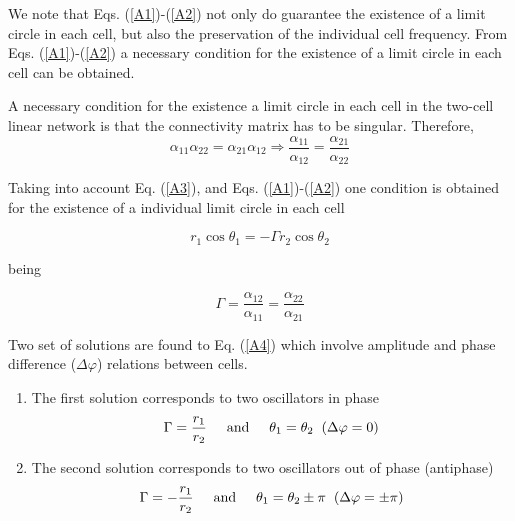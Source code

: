 We note that Eqs. (\ref{A1})-(\ref{A2}) not only do guarantee the existence of a limit circle in each cell, but also the preservation of the individual cell frequency. From Eqs. (\ref{A1})-(\ref{A2}) a necessary condition for the existence of a limit circle in each cell can be obtained.

\begin{Statement}
A necessary condition for the existence a limit circle in each cell in the two-cell linear network is that the connectivity matrix has to be singular. Therefore,
\begin{equation}
    \alpha_{11}\alpha_{22} = \alpha_{21}\alpha_{12} \Longrightarrow \frac{\alpha_{11}}{\alpha_{12}} = \frac{\alpha_{21}}{\alpha_{22}} 
    \label{A3}
\end{equation}
\end{Statement}

Taking into account Eq. (\ref{A3}), and Eqs. (\ref{A1})-(\ref{A2}) one condition is obtained for the existence of a individual limit circle in each cell

\begin{equation}
    r_{1}\cos{\theta_{1}} = - \Gamma r_{2}\cos{\theta_{2}}
    \label{A4}
\end{equation}

being 

\begin{equation}
\Gamma = \frac{\alpha_{12}}{\alpha_{11}} = \frac{\alpha_{22}}{\alpha_{21}}
\end{equation}

Two set of solutions are found to Eq. (\ref{A4}) which involve amplitude and phase difference ($\Delta \varphi$) relations between cells.

\begin{enumerate}
    \item The first solution corresponds to two oscillators in phase
    \begin{equation}
        \Gamma = \frac{r_{1}}{r_{2}} \hspace{0.5cm}  \text{and} \hspace{0.5cm} \theta_{1} = \theta_{2} \hspace{0.2cm} (\Delta \varphi = 0)
         \label{A5}
    \end{equation}
    \item The second solution corresponds to two oscillators out of phase (antiphase)
        \begin{equation}
        \Gamma = -\frac{r_{1}}{r_{2}} \hspace{0.5cm} \text{and} \hspace{0.5cm} \theta_{1} = \theta_{2} \pm \pi \hspace{0.2cm} (\Delta \varphi = \pm \pi)
         \label{A6}
    \end{equation}
\end{enumerate}

